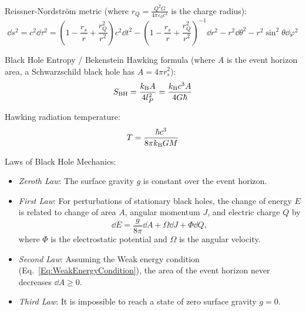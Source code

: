 			\noindent
			Reissner-Nordström metric (where $r_Q = \frac{Q^2 G}{4\pi \varepsilon_0 c^4}$ is the charge radius):
			\begin{equation}
				\dd s^{2}=c^{2}\dd\tau ^{2}=\left(1-{\frac {r_s}{r}}+{\frac {r_Q^{2}}{r^{2}}}\right)c^{2}\dd t^{2}-\left(1-{\frac {r_s}{r}}+{\frac {r_Q^{2}}{r^{2}}}\right)^{-1}\dd r^{2}-r^{2}\dd\theta ^{2}-r^{2}\sin ^{2}\theta \dd\varphi ^{2}
			\end{equation}

			\noindent
			Black Hole Entropy / Bekenstein Hawking formula (where $A$ is the event horizon area, \eg a Schwarzschild black hole has $A=4\pi r_s^2$):
			\begin{equation}
				S_\mathrm{BH} = \frac{k_{\text{B}} A}{4 l_P^2}
				= \frac{k_{\text{B}} c^3 A}{4 G \hbar}
			\end{equation}

			\noindent
			Hawking radiation temperature:
			\begin{equation}
				T = \frac{\hbar c^3}{8\pi k_{\text{B}} G M}
			\end{equation}

			\noindent
			Laws of Black Hole Mechanics:
			\begin{itemize}
				\item \emph{Zeroth Law}: The surface gravity $g$ is constant over the event horizon.
				\item \emph{First Law}: For perturbations of stationary black holes, the change of energy $E$ is related to change of area $A$, angular momentum $J$, and electric charge $Q$ by
					\begin{equation}
						\dd E = \frac{g}{8\pi} \dd A + \Omega \dd J + \Phi \dd Q,
					\end{equation}
					where $\Phi$ is the electrostatic potential and $\Omega$ is the angular velocity.
				\item \emph{Second Law}: Assuming the Weak energy condition (Eq.~\ref{Eq:WeakEnergyCondition}), the area of the event horizon never decreases $\dd A \ge 0$.
				\item \emph{Third Law}: It is impossible to reach a state of zero surface gravity $g=0$.
			\end{itemize}

